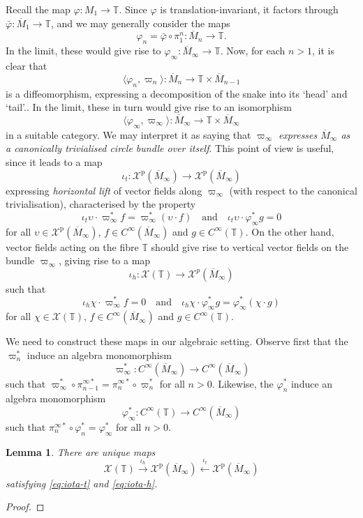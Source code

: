 \documentclass{article}
\def\TT{\mathbb{T}}
\def\XX{\mathcal{X}}
\def\p{\mathrm{p}}
\newtheorem{lem}{Lemma}
\theoremstyle{definition}
\begin{document}
Recall the map $\varphi : M_1 \to \TT$. Since $\varphi$ is
translation-invariant, it factors through $\bar\varphi : \overline M_1 \to \TT$,
and we may generally consider the maps
$$ \varphi_n = \bar\varphi \circ \pi^n_1 : \overline M_n \to \TT. $$
In the limit, these would give rise to $\varphi_\infty : \overline M_\infty \to \TT$. 
Now, for each $n>1$, it is clear that
$$ \langle \varphi_n, \varpi_n\rangle : \overline M_n \to \TT \times \overline M_{n-1} $$
is a diffeomorphism, expressing a decomposition of the snake into its `head' and `tail'..
In the limit, these in turn would give rise to an isomorphism
$$ \langle \varphi_\infty, \varpi_\infty\rangle : \overline M_\infty \to \TT\times\overline M_\infty $$
in a suitable category. We may interpret it as saying that $\varpi_\infty$
\emph{expresses $\overline M_\infty$ as a canonically trivialised circle bundle over itself}.
This point of view is useful, since it leads to a map
$$ \iota_t : \XX^\p(\overline M_\infty) \to \XX^\p(\overline M_\infty) $$
expressing \emph{horizontal lift} of vector fields along $\varpi_\infty$
(with respect to the canonical trivialisation), characterised by the property
\begin{equation}\label{eq:iota-t}
        \iota_t \upsilon \cdot \varpi_\infty^* f= \varpi_\infty^* (\upsilon \cdot f)\quad \textrm{and}\quad
        \iota_t \upsilon \cdot \varphi_\infty^* g = 0
\end{equation}
for all $\upsilon\in\XX^\p(\overline M_\infty)$, $f \in C^\infty(\overline M_\infty)$ 
and $g \in C^\infty(\TT)$.
On the other hand, vector fields acting on the fibre $\TT$
should give rise to vertical vector fields on the bundle $\varpi_\infty$, giving rise to a map
$$ \iota_h : \XX(\TT) \to \XX^p(\overline M_\infty) $$
such that
\begin{equation}\label{eq:iota-h} \iota_h \chi \cdot \varpi_\infty^* f = 0\quad\textrm{and}\quad \iota_h \chi \cdot \varphi_\infty^* g = \varphi_\infty^* (\chi\cdot g) \end{equation}
for all $\chi\in\XX(\TT)$, $f \in C^\infty(\overline M_\infty)$ 
and $g \in C^\infty(\TT)$.

We need to construct these maps
in our algebraic setting. Observe first that the $\varpi_n^*$
induce an algebra monomorphism
$$ \varpi_\infty^* : C^\infty(\overline M_\infty) \to C^\infty(\overline M_\infty) $$
such that
$\varpi_\infty^* \circ \pi^{\infty*}_{n-1} = \pi^{\infty*}_n \circ \varpi_n^*$ for all $n>0$.
Likewise, the $\varphi_n^*$
induce an algebra monomorphism
$$ \varphi_\infty^* : C^\infty(\TT) \to C^\infty(\overline M_\infty)$$
such that
$\pi^{\infty*}_n \circ \varphi_n^* = \varphi_\infty^*$ for all $n>0$.
\begin{lem}\label{lem:iota}
        There are unique maps
        $$\XX(\TT) \xrightarrow{\iota_h} \XX^\p(\overline M_\infty) \xleftarrow{\iota_t} \XX^\p(\overline M_\infty)
        $$
satisfying \eqref{eq:iota-t} and \eqref{eq:iota-h}.
\end{lem}
\begin{proof}
\end{proof}
\end{document}
